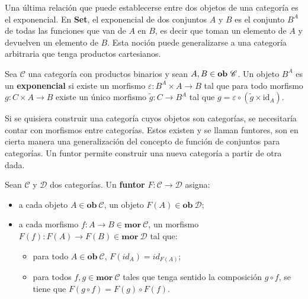 Una última relación que puede establecerse entre dos objetos de una categoría es el exponencial. En \textbf{Set}, el exponencial de dos conjuntos $A$ y $B$ es el conjunto $B^A$ de todas las funciones que van de $A$ en $B$, es decir que toman un elemento de $A$ y devuelven un elemento de $B$. Esta noción puede generalizarse a una categoría arbitraria que tenga productos cartesianos.

\begin{definition}[Exponencial]
Sea $\mathscr{C}$ una categoría con productos binarios y sean $A,B \in \text{\bf ob} \ \mathscr{C}$. Un objeto $B^A$ es un \textbf{exponencial} si existe un morfismo $\varepsilon : B^A \times A \rightarrow B$ tal que para todo morfismo $g : C \times A \rightarrow B$ existe un único morfismo $\tilde{g} : C \rightarrow B^A$ tal que $g = \varepsilon \circ (\tilde{g} \times \text{id}_A)$.
\end{definition}

Si se quisiera construir una categoría cuyos objetos son categorías, se necesitaría contar con morfismos entre categorías. Estos existen y se llaman funtores, son en cierta manera una generalización del concepto de función de conjuntos para categorías. Un funtor permite construir una nueva categoría a partir de otra dada.
 
\begin{definition}[Funtor]
Sean $\mathscr{C}$ y $\mathscr{D}$ dos categorías. Un \textbf{funtor} $\mathit{F} : \mathscr{C} \rightarrow \mathscr{D}$ asigna:
\begin{itemize}[noitemsep,label=$\blacktriangleright$]
	\item a cada objeto $A \in \mathbf{ob} \ \mathscr{C}$, un objeto $\mathit{F}(A) \in \mathbf{ob} \ \mathscr{D}$;
	\item a cada morfismo $f : A \rightarrow B \in \mathbf{mor} \ \mathscr{C}$, un morfismo $\mathit{F}(f) : \mathit{F}(A) \rightarrow \mathit{F}(B) \in \mathbf{mor} \ \mathscr{D}$ tal que: 
	\begin{itemize}[noitemsep,label=$\bullet$]
		\item para todo $A \in \mathbf{ob} \ \mathscr{C}$, $\mathit{F}(id_A) = id_{\mathit{F}(A)}$;
		\item para todos $f,g \in \mathbf{mor} \ \mathscr{C}$ tales que tenga sentido la composición $g \circ f$, se tiene que $\mathit{F}(g \circ f) = \mathit{F}(g) \circ \mathit{F}(f)$.
	\end{itemize}
\end{itemize}
\end{definition}

